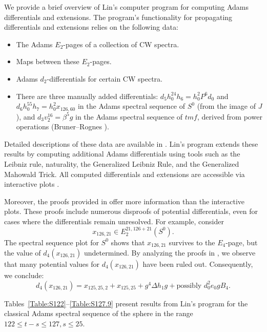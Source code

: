\documentclass{amsart}
\numberwithin{equation}{section}
\begin{document}
We provide a brief overview of Lin's computer program for computing Adams differentials and extensions. The program's functionality for propagating differentials and extensions relies on the following data:
\begin{itemize}
    \item The Adams $E_2$-pages of a collection of CW spectra.
    \item Maps between these $E_2$-pages.
    \item Adams $d_2$-differentials for certain CW spectra.
    \item There are three manually added differentials: $d_5 h_0^{24}h_6=h_0^2P^6d_0$ and\\
 $d_6 h_0^{55}h_7=h_0^2x_{126,60}$ in the Adams spectral sequence of $S^0$ (from the image of $J$), and $d_3 v_2^{16}=\beta^5g$ in the Adams spectral sequence of $\mathit{tmf}$, derived from power operations (Bruner--Rognes \cite{BR21}).
\end{itemize}

Detailed descriptions of these data are available in \cite{LWXZenodo}. Lin’s program extends these results by computing additional Adams differentials using tools such as the Leibniz rule, naturality, the Generalized Leibniz Rule, and the Generalized Mahowald Trick. All computed differentials and extensions are accessible via interactive plots \cite{LinPlot}.

Moreover, the proofs provided in \cite{LWXZenodo} offer more information than the interactive plots. These proofs include numerous disproofs of potential differentials, even for cases where the differentials remain unresolved. For example, consider 
$$x_{126,21}\in E_2^{21,126+21}(S^0).$$
The spectral sequence plot for $S^0$ shows that $x_{126,21}$ survives to the $E_4$-page, but the value of $d_4(x_{126,21})$ undetermined. By analyzing the proofs in \cite{LWXZenodo}, we observe that many potential values for $d_4(x_{126,21})$ have been ruled out. Consequently, we conclude:
$$d_4(x_{126,21})=x_{125,25,2}+x_{125,25}+g^4\Delta h_1g+\text{possibly }d_0^2e_0gB_4.$$

Tables~\ref{Table:S122}--\ref{Table:S127.9} present results from Lin’s program for the classical Adams spectral sequence of the sphere in the range $122 \le t-s \le 127, s \le 25$.
\end{document}
